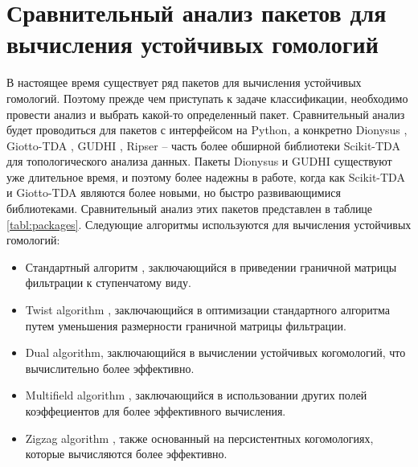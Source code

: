 \section{Сравнительный анализ пакетов для вычисления устойчивых гомологий}

В настоящее время существует ряд пакетов для вычисления устойчивых гомологий. Поэтому прежде чем приступать к задаче классификации, необходимо провести анализ и выбрать какой-то определенный пакет. Сравнительный анализ будет проводиться для пакетов с интерфейсом на Python, а конкретно Dionysus \cite{dionysus}, Giotto-TDA \cite{giotto}, GUDHI \cite{gudhi}, Ripser \cite{Ripser} -- часть более обширной библиотеки Scikit-TDA \cite{scikit} для топологического анализа данных. 
\newline
Пакеты Dionysus и GUDHI существуют уже длительное время, и поэтому более надежны в работе, когда как Scikit-TDA и Giotto-TDA являются более новыми, но быстро развивающимися библиотеками.
Сравнительный анализ этих пакетов представлен в таблице \ref{tabl:packages}.
Следующие алгоритмы используются для вычисления устойчивых гомологий:
\begin{itemize}
	\item Стандартный алгоритм \cite{Zomorodian}, заключающийся в приведении граничной матрицы фильтрации к ступенчатому виду.
	\item Twist algorithm \cite{twist}, заключающийся в оптимизации стандартного алгоритма путем уменьшения размерности граничной матрицы фильтрации.
	\item Dual algorithm, заключающийся в вычислении устойчивых когомологий, что вычислительно более эффективно.
	\item Multifield algorithm \cite{multifield}, заключающийся в использовании других полей коэффециентов для более эффективного вычисления.
	\item Zigzag algorithm \cite{zigzag}, также основанный на персистентных когомологиях, которые вычисляются более эффективно. 
\end{itemize}
